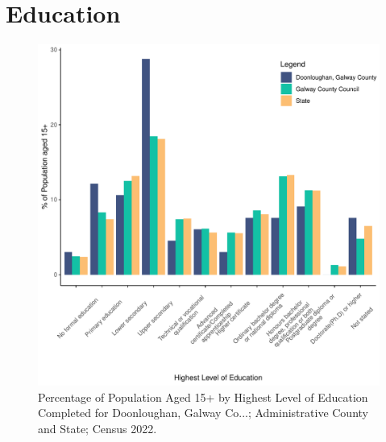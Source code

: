 \documentclass{article}
\begin{document}
\section{Education}\label{sect:Edu}
\begin{figure}[H]
	\centering
	\includegraphics[width = 120mm]{../figures/EduED.pdf}
	\caption{Percentage of Population Aged 15+ by Highest Level of Education Completed for Doonloughan, Galway Co...; Administrative County and State; Census 2022.}
	\label{fig:vbnv}
	\end{figure}
\end{document}
